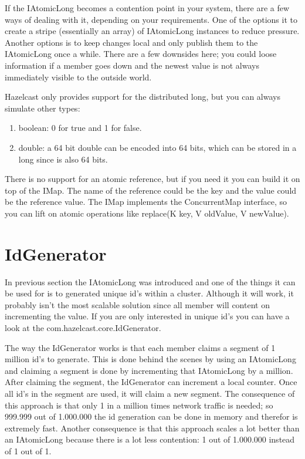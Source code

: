If the IAtomicLong becomes a contention point in your system, there are a few ways of dealing with it, depending on your requirements. One of the options it to create a stripe (essentially an array) of IAtomicLong instances to reduce pressure. Another options is to keep changes local and only publish them to the IAtomicLong once a while. There are a few downsides here; you could loose information if a member goes down and the newest value is not always immediately visible to the outside world. 

Hazelcast only provides support for the distributed long, but you can always simulate other types:
\begin{enumerate}
\item boolean: 0 for true and 1 for false.
\item double: a 64 bit double can be encoded into 64 bits, which can be stored in a long since is also 64 bits.
\end{enumerate}
There is no support for an atomic reference, but if you need it you can build it on top of the IMap. The name of the reference could be the key and the value could be the reference value. The IMap implements the ConcurrentMap interface, so you can lift on atomic operations like replace(K key, V oldValue, V newValue). 

\section{IdGenerator}
In previous section the IAtomicLong was introduced and one of the things it can be used for is to generated unique id's within a cluster. Although it will work, it probably isn't the most scalable solution since all member will content on incrementing the value. If you are only interested in unique id's you can have a look at the com.hazelcast.core.IdGenerator.

The way the IdGenerator works is that each member claims a segment of 1 million id's to generate. This is done behind the scenes by using an IAtomicLong and claiming a segment is done by incrementing that IAtomicLong by a million. After claiming the segment, the IdGenerator can increment a local counter. Once all id's in the segment are used, it will claim a new segment. The consequence of this approach is that only 1 in a million times network traffic is needed; so 999.999 out of 1.000.000 the id generation can be done in memory and therefor is extremely fast. Another consequence is that this approach scales a lot better than an IAtomicLong because there is a lot less contention: 1 out of 1.000.000 instead of 1 out of 1.

